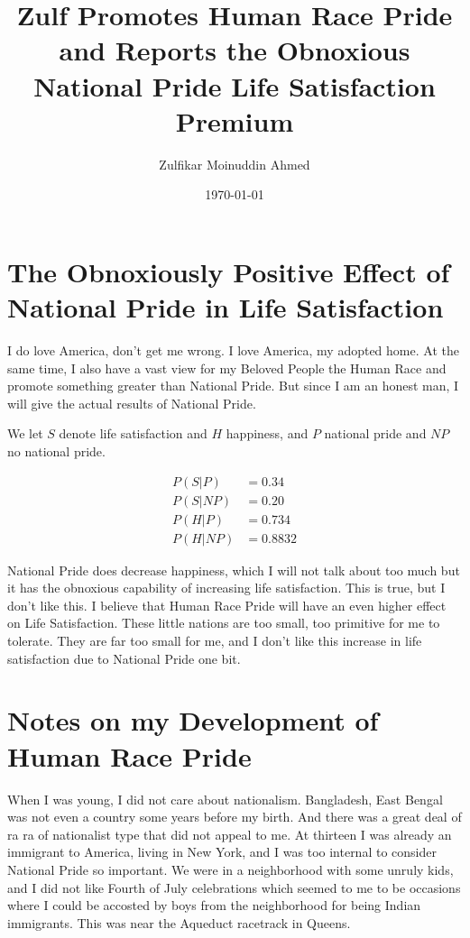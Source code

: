 \documentclass{amsart}
\title{Zulf Promotes Human Race Pride and Reports the Obnoxious National Pride Life Satisfaction Premium}
\author{Zulfikar Moinuddin Ahmed}
\date{\today}
\begin{document}
\maketitle

\section{The Obnoxiously Positive Effect of National Pride in Life Satisfaction}

I do love America, don't get me wrong.  I love America, my adopted home.  At the same time, I also have a vast view for my Beloved People the Human Race and promote something greater than National Pride.  But since I am an honest man, I will give the actual results of National Pride.

We let $S$ denote life satisfaction and $H$ happiness, and $P$ national pride and $NP$ no national pride.

\begin{align*}
P(S|P) &= 0.34\\
P(S|NP) &= 0.20\\
P(H|P) &= 0.734\\
P(H|NP) &= 0.8832
\end{align*}

National Pride does decrease happiness, which I will not talk about too much but it has the obnoxious capability of increasing life satisfaction.  This is true, but I don't like this.  I believe that Human Race Pride will have an even higher effect on Life Satisfaction.  These little nations are too small, too primitive for me to tolerate.  They are far too small for me, and I don't like this increase in life satisfaction due to National Pride one bit.

\section{Notes on my Development of Human Race Pride}

When I was young, I did not care about nationalism.  Bangladesh, East Bengal was not even a country some years before my birth.  And there was a great deal of ra ra of nationalist type that did not appeal to me.  At thirteen I was already an immigrant to America, living in New York, and I was too internal to consider National Pride so important.  We were in a neighborhood with some unruly kids, and I did not like Fourth of July celebrations which seemed to me to be occasions where I could be accosted by boys from the neighborhood for being Indian immigrants.  This was near the Aqueduct racetrack in Queens.
\end{document}
